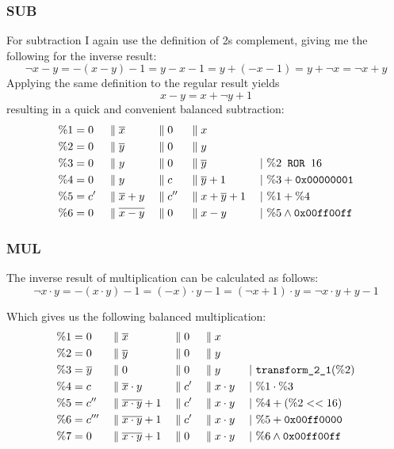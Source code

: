 \subsubsection{SUB}
For subtraction I again use the definition of 2s complement, giving me the following for the inverse result:
\begin{equation*}
  \neg{x-y} = - (x-y) - 1 = y - x - 1 = y + (-x -1) = y + \neg{x} = \neg{x} + y
\end{equation*}
Applying the same definition to the regular result yields
\begin{equation*}
  x-y = x + \neg{y} + 1
\end{equation*}
resulting in a quick and convenient balanced subtraction:
\begin{align*}
  \%1 &= 0 && \; \| \;  \overline{x} &&\; \| \;  0 &&\; \| \;  x      &&\\
  \%2 &= 0 && \; \| \;  \overline{y} &&\; \| \;  0 &&\; \| \;  y      &&\\
  \%3 &= 0 && \; \| \;  y &&\; \| \;  0 &&\; \| \;  \overline{y}    &&\;|\ \%2 \texttt{ ROR } 16\\
  \%4 &= 0 && \; \| \;  y &&\; \| \;  c &&\; \| \;  \overline{y}+1 &&\;|\ \%3 + \texttt{0x00000001}\\
  \%5 &= c' && \; \| \;  \overline{x}+y &&\; \| \;  c'' &&\; \| \;  x+\overline{y}+1  &&\;|\ \%1 + \%4\\
  \%6 &= 0 && \; \| \;  \overline{x-y} &&\; \| \;  0 &&\; \| \;  x-y &&\;|\ \%5 \land \texttt{0x00ff00ff}
\end{align*}

\subsubsection{MUL}
The inverse result of multiplication can be calculated as follows:
\begin{equation*}
  \neg{x \cdot y} = -(x \cdot y) - 1 = (-x) \cdot y - 1 = (\neg{x} + 1) \cdot y = \neg{x} \cdot y + y - 1
\end{equation*}

Which gives us the following balanced multiplication:
\begin{align*}
  \%1 &= 0 && \; \| \;  \overline{x} && \; \| \;  0 && \; \| \;  x &&\\
  \%2 &= 0 && \; \| \;  \overline{y} && \; \| \;  0 && \; \| \;  y &&\\
  \%3 &= \overline{y} && \; \| \;  0 && \; \| \;  0 && \; \| \;  y &&\;|\ \texttt{transform\_2\_1}(\%2)\\
  \%4 &= c && \; \| \;  \overline{x} \cdot y && \; \| \;  c' && \; \| \;  x \cdot y &&\;|\ \%1 \cdot \%3\\
  \%5 &= c'' && \; \| \;  \overline{x \cdot y} + 1 && \; \| \;  c' && \; \| \;  x \cdot y &&\;|\ \%4 + (\%2 << 16)\\
  \%6 &= c''' && \; \| \;  \overline{x \cdot y} + 1 && \; \| \;  c' && \; \| \;  x \cdot y &&\;|\ \%5 + \texttt{0x00ff0000}\\
  \%7 &= 0 && \; \| \;  \overline{x \cdot y} + 1 && \; \| \;  0 && \; \| \;  x \cdot y &&\;|\ \%6 \land \texttt{0x00ff00ff}
\end{align*}

